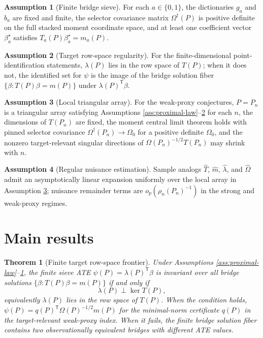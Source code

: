\documentclass[11pt]{article}
\newcommand{\transpose}{\mathsf{T}}
\theoremstyle{definition}
\newtheorem{assumption}{Assumption}
\theoremstyle{plain}
\newtheorem{theorem}{Theorem}
\theoremstyle{remark}
\begin{document}
\begin{assumption}[Finite bridge sieve]\label{ass:finite-bridge}
For each $a\in\{0,1\}$, the dictionaries $g_a$ and $b_a$ are fixed and finite,
the selector covariance matrix $\Omega^\dagger(P)$ is positive definite on the
full stacked moment coordinate space,
and at least one coefficient vector $\beta_a^\star$ satisfies
$T_a(P)\beta_a^\star=m_a(P)$.
\end{assumption}

\begin{assumption}[Target row-space regularity]\label{ass:target-rowspace}
For the finite-dimensional point-identification statements,
$\lambda(P)$ lies in the row space of $T(P)$; when it does not, the identified
set for $\psi$ is the image of the bridge solution fiber
$\{\beta:T(P)\beta=m(P)\}$ under $\lambda(P)^\transpose\beta$.
\end{assumption}

\begin{assumption}[Local triangular array]\label{ass:local-array}
For the weak-proxy conjectures, $P=P_n$ is a triangular array satisfying
Assumptions \ref{ass:proximal-law}--\ref{ass:target-rowspace} for each $n$,
the dimensions of $T(P_n)$ are fixed, the moment central limit theorem holds
with pinned selector covariance $\Omega^\dagger(P_n)\to\Omega_0$ for a positive
definite $\Omega_0$, and the nonzero target-relevant singular directions of
$\Omega(P_n)^{-1/2}T(P_n)$ may shrink with $n$.
\end{assumption}

\begin{assumption}[Regular nuisance estimation]\label{ass:regular-nuisance}
Sample analogs $\widehat T$, $\widehat m$, $\widehat\lambda$, and
$\widehat\Omega$ admit an asymptotically linear expansion uniformly over the
local array in Assumption \ref{ass:local-array}; nuisance remainder terms are
$o_p(\rho_n(P_n)^{-1})$ in the strong and weak-proxy regimes.
\end{assumption}

\section{Main results}
\begin{theorem}[Finite target row-space frontier]\label{thm:rowspace}
Under Assumptions \ref{ass:proximal-law}--\ref{ass:finite-bridge}, the finite
sieve ATE $\psi(P)=\lambda(P)^\transpose\beta$ is invariant over all bridge
solutions $\{\beta:T(P)\beta=m(P)\}$ if and only if
\[
\lambda(P)\perp\ker T(P),
\]
equivalently $\lambda(P)$ lies in the row space of $T(P)$.  When the condition
holds, $\psi(P)=q(P)^\transpose\Omega(P)^{-1/2}m(P)$ for the minimal-norm
certificate $q(P)$ in the target-relevant weak-proxy index.  When it fails,
the finite bridge solution fiber contains two observationally equivalent
bridges with different ATE values.
\end{theorem}
\end{document}
